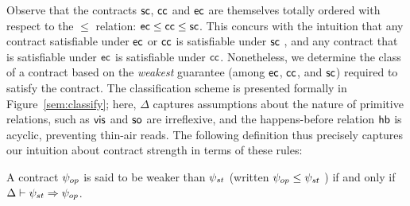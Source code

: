 \noindent Observe that the contracts ${\sf sc}$, ${\sf cc}$ and ${\sf ec}$ are
themselves totally ordered with respect to the $\le$ relation: ${\sf ec} \le
{\sf cc} \le {\sf sc}$. This concurs with the intuition that any contract
satisfiable under ${\sf ec}$ or ${\sf cc}$ is satisfiable under ${\sf sc}$ , and any
contract that is satisfiable under ${\sf ec}$ is satisfiable under
${\sf cc}$. Nonetheless, we determine the class of a contract based on the
\emph{weakest} guarantee (among ${\sf ec}$, ${\sf cc}$, and ${\sf sc}$) required to
satisfy the contract. The classification scheme is presented formally 
in Figure~\ref{sem:classify}; here, $\Delta$ captures assumptions about the nature of primitive
relations, such as ${\normalfont \textsf{vis}}$ and ${\normalfont \textsf{so}}$ are irreflexive, and the happens-before
relation ${\normalfont \textsf{hb}}$ is acyclic, preventing thin-air reads.   The following definition thus precisely
captures our intuition about contract strength in terms of these rules:

\begin{definition}
A contract $\psi_{op}$ is said to be weaker than $\psi_{st}$ (written $\psi_{op}
\le \psi_{st}$ ) if and only if $\Delta \vdash \psi_{st} \Rightarrow \psi_{op}$.
\begin{center}
\end{center}
\end{definition}
\vspace{-1em}



